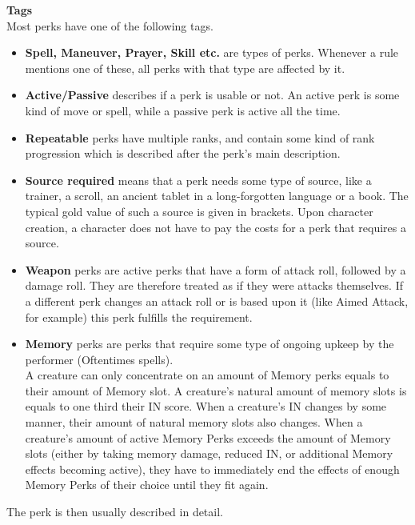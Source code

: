 \textbf{Tags}\\
Most perks have one of the following tags.\\
\begin{itemize}
	\item \textbf{Spell, Maneuver, Prayer, Skill etc.} are types of perks.
	 Whenever a rule mentions one of these, all perks with that type are affected by it.\\
	\item \textbf{Active/Passive} describes if a perk is usable or not.
	An active perk is some kind of move or spell, while a passive perk is active all the time.\\
	\item \textbf{Repeatable} perks have multiple ranks, and contain some kind of rank progression which is described after the perk's main description.\\
	\item \textbf{Source required} means that a perk needs some type of source, like a trainer, a scroll, an ancient tablet in a long-forgotten language or a book.
	The typical gold value of such a source is given in brackets.
	Upon character creation, a character does not have to pay the costs for a perk that requires a source.\\
	\item \textbf{Weapon} perks are active perks that have a form of attack roll, followed by a damage roll.
	They are therefore treated as if they were attacks themselves.
	If a different perk changes an attack roll or is based upon it (like Aimed Attack, for example) this perk fulfills the requirement.\\
	\item \textbf{Memory} perks are perks that require some type of ongoing upkeep by the performer (Oftentimes spells).\\
	A creature can only concentrate on an amount of Memory perks equals to their amount of Memory slot.
	A creature's natural amount of memory slots is equals to one third their IN score.
	When a creature's IN changes by some manner, their amount of natural memory slots also changes.
	When a creature's amount of active Memory Perks exceeds the amount of Memory slots (either by taking memory damage, reduced IN, or additional Memory effects becoming active), they have to immediately end the effects of enough Memory Perks of their choice until they fit again.
\end{itemize}

The perk is then usually described in detail.

